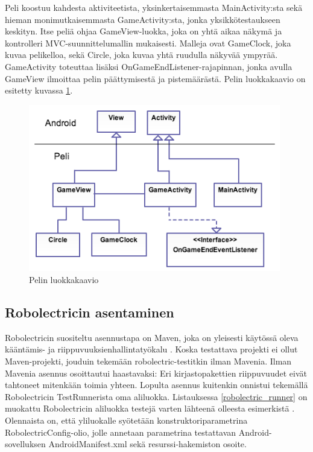 Peli koostuu kahdesta aktiviteetista, yksinkertaisemmasta MainActivity:sta sekä hieman monimutkaisemmasta GameActivity:sta, jonka yksikkötestaukseen keskityn. Itse peliä ohjaa GameView-luokka, joka on yhtä aikaa näkymä ja kontrolleri MVC-suunnittelumallin mukaisesti. Malleja ovat GameClock, joka kuvaa pelikelloa, sekä Circle, joka kuvaa yhtä ruudulla näkyvää ympyrää. GameActivity toteuttaa lisäksi OnGameEndListener-rajapinnan, jonka avulla GameView ilmoittaa pelin päättymisestä ja pistemäärästä. Pelin luokkakaavio on esitetty kuvassa \ref{game_classdiagram}.

\begin{figure}[htb]
\includegraphics[width=110mm]{peli_luokkakaavio.png}
\caption{Pelin luokkakaavio} \label{game_classdiagram}
\end{figure}


\subsection{Robolectricin asentaminen}
\label{robolectric_install}

Robolectricin suositeltu asennustapa on Maven, joka on yleisesti käytössä oleva kääntämis- ja riippuvuuksienhallintatyökalu \cite{maven}. Koska testattava projekti ei ollut Maven-projekti, jouduin tekemään robolectric-testitkin ilman Mavenia. Ilman Mavenia asennus osoittautui haastavaksi: Eri kirjastopakettien riippuvuudet eivät tahtoneet mitenkään toimia yhteen. Lopulta asennus kuitenkin onnistui tekemällä Robolectricin TestRunnerista oma aliluokka. Listauksessa \ref{robolectric_runner} on muokattu Robolectricin aliluokka testejä varten lähteenä olleesta esimerkistä \cite{sample_runner}. Olennaista on, että yliluokalle syötetään konstruktoriparametrina RobolectricConfig-olio, jolle annetaan parametrina testattavan Android-sovelluksen AndroidManifest.xml sekä resurssi-hakemiston osoite.

